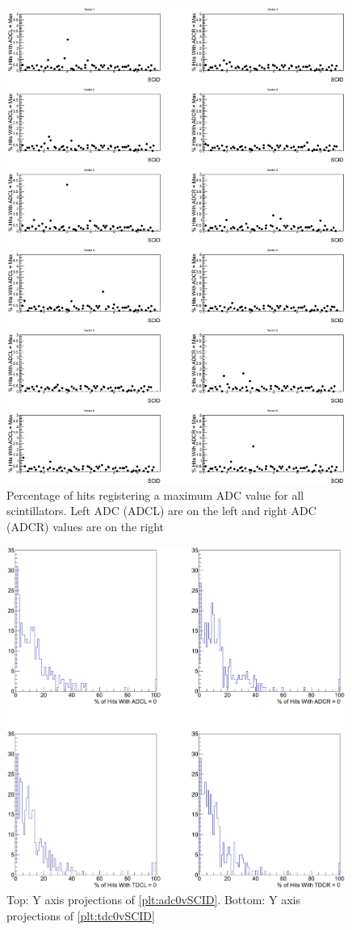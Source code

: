 \begin{figure}[!htbp]
    \includegraphics[width=0.99\textwidth]{figures/calib/tof/tofko/adcMax.eps}
    \caption{Percentage of hits registering a maximum ADC value for all scintillators. Left ADC (ADCL) are on the left and right ADC (ADCR) values are on the right}
    \label{plt:adcMvSCID}
\end{figure}

\begin{figure}[!htbp]
    \includegraphics[width=0.99\textwidth]{figures/calib/tof/tofko/adctdc0perc.eps}
    \caption{Top: Y axis projections of \ref{plt:adc0vSCID}. Bottom: Y axis projections of \ref{plt:tdc0vSCID}}
    \label{plt:proj}
\end{figure}
